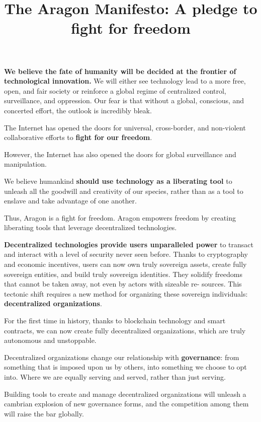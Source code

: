 
\title{The Aragon Manifesto: A pledge to fight for freedom}



\mytitle

\textbf{We believe the fate of humanity will be decided at the frontier of technological innovation.} 
We will either see technology lead to a more free, open, and fair society or reinforce a global regime of centralized control, surveillance, and oppression. Our fear is that without a global, conscious, and concerted effort, the outlook is incredibly bleak.

The Internet has opened the doors for universal, cross-border, and non-violent collaborative efforts to \textbf{fight for our freedom}.

However, the Internet has also opened the doors for global surveillance and manipulation.

We believe humankind \textbf{should use technology as a liberating tool} to unleash all the goodwill and creativity of our species, rather than as a tool to enslave and take advantage of one another.

Thus, Aragon is a fight for freedom. Aragon empowers freedom by creating liberating tools that leverage decentralized technologies.

\textbf{Decentralized technologies provide users unparalleled power} to transact and interact with a level of security never seen before. Thanks to cryptography and economic incentives, users can now own truly sovereign assets, create fully sovereign entities, and build truly sovereign identities. They solidify freedoms that cannot be taken away, not even by actors with sizeable re- sources. This tectonic shift requires a new method for organizing these sovereign individuals: \textbf{decentralized organizations}.

For the first time in history, thanks to blockchain technology and smart contracts, we can now create fully decentralized organizations, which are truly autonomous and unstoppable.

Decentralized organizations change our relationship with \textbf{governance}: from something that is imposed upon us by others, into something we choose to opt into. 
Where we are equally serving and served, rather than just serving.

Building tools to create and manage decentralized organizations will unleash a cambrian explosion of new governance forms, and the competition among them will raise the bar globally.


